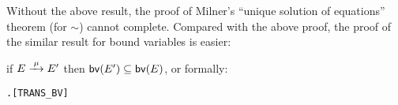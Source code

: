 Without the above result, the proof of Milner's ``unique solution of
equations'' theorem (for $\sim$) cannot complete. Compared with the
above proof, the proof of the similar result for bound variables is easier:
\begin{proposition}
\label{prop:transBV}
if $E \arr{\mu} E'$ then ${{\rm\sf{bv}}}(E') \subseteq {{\rm\sf{bv}}}(E)$, or formally:
\begin{alltt}
\HOLTokenTurnstile{} \HOLSymConst{\HOLTokenForall{}}  .  \HOLTokenTransBegin{}\HOLTokenTransEnd {} \HOLSymConst{\HOLTokenImp{}}   \HOLSymConst{\HOLTokenSubset{}}  \hfill{[TRANS_BV]}
\end{alltt}
\end{proposition}
